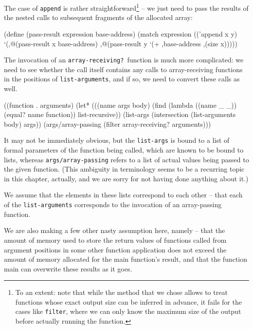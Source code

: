 The case of \texttt{append} is rather straightforward\footnote{
  To an extent: note that while the method that we chose allows
  to treat functions whose exact output size can be inferred in
  advance, it fails for the cases like \texttt{filter}, where
  we can only know the maximum size of the output before actually
  running the function.
} -- we just need to pass the results of the nested calls to
subsequent fragments of the allocated array:

\begin{Snippet}
    (define (pass-result expression base-address)
      (match expression
	(('append x y)
	 `(,@(pass-result x base-address)
           ,@(pass-result y `(+ ,base-address ,(size x)))))
\end{Snippet}

The invocation of an \texttt{array-receiving?}~function is much more
complicated: we need to see whether the call itself contains any
calls to array-receiving functions in the positions of
\texttt{list-arguments}, and if so, we need to convert these calls
as well.

\begin{Snippet}
	((function . arguments)
	 (let* (((name args body) (find (lambda ((name _ _))
					  (equal? name function))
					list-recursive))
	        (list-args (intersection (list-arguments body)
                                        args))
                (args/array-passing (filter array-receiving?
                                            arguments)))
\end{Snippet}

It may not be immediately obvious, but the \texttt{list-args} is bound
to a list of formal parameters of the function being called, which are
known to be bound to lists, whereas \texttt{args/array-passing} refers
to a list of actual values being passed to the given function. (This
ambiguity in terminology seems to be a recurring topic in this chapter,
actually, and we are sorry for not having done anything about it.)

We assume that the elements in these lists correspond to each other
-- that each of the \texttt{list-arguments} corresponds to the invocation
of an array-passing function.

We are also making a few other nasty assumption here, namely -- that
the amount of memory used to store the return values of functions
called from argument positions in some other function application
does not exceed the amount of memory allocated for the main function's
result, and that the function main can overwrite these results as it goes.

